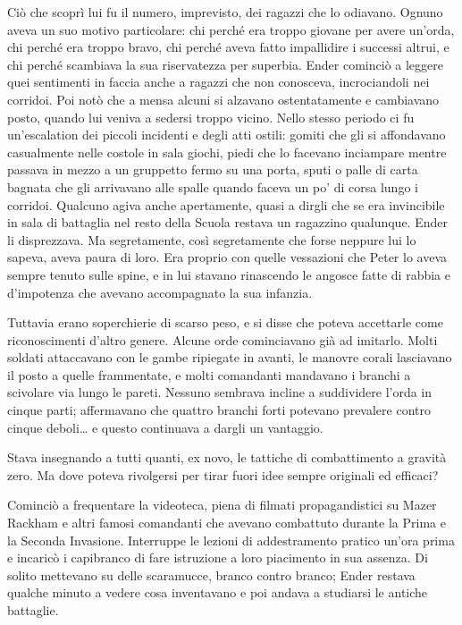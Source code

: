 {Ciò che scoprì lui fu il numero, imprevisto, dei ragazzi che lo
	odiavano. Ognuno aveva un suo motivo particolare: chi perché era troppo
	giovane per avere un'orda, chi perché era troppo bravo, chi perché aveva
	fatto impallidire i successi altrui, e chi perché scambiava la sua
	riservatezza per superbia. Ender cominciò a leggere quei sentimenti in
	faccia anche a ragazzi che non conosceva, incrociandoli nei corridoi.
	Poi notò che a mensa alcuni si alzavano ostentatamente e cambiavano
	posto, quando lui veniva a sedersi troppo vicino. Nello stesso periodo
	ci fu un'escalation dei piccoli incidenti e degli atti ostili: gomiti
	che gli si affondavano casualmente nelle costole in sala giochi, piedi
	che lo facevano inciampare mentre passava in mezzo a un gruppetto fermo
	su una porta, sputi o palle di carta bagnata che gli arrivavano alle
	spalle quando faceva un po' di corsa lungo i corridoi. Qualcuno agiva
	anche apertamente, quasi a dirgli che se era invincibile in sala di
	battaglia nel resto della Scuola restava un ragazzino qualunque. Ender
	li disprezzava. Ma segretamente, così segretamente che forse neppure lui
	lo sapeva, aveva paura di loro. Era proprio con quelle vessazioni che
	Peter lo aveva sempre tenuto sulle spine, e in lui stavano rinascendo le
	angosce fatte di rabbia e d'impotenza che avevano accompagnato la sua
	infanzia.}

{Tuttavia erano soperchierie di scarso peso, e si disse che poteva
	accettarle come riconoscimenti d'altro genere. Alcune orde cominciavano
	già ad imitarlo. Molti soldati attaccavano con le gambe ripiegate in
	avanti, le manovre corali lasciavano il posto a quelle frammentate, e
	molti comandanti mandavano i branchi a scivolare via lungo le pareti.
	Nessuno sembrava incline a suddividere l'orda in cinque parti;
	affermavano che quattro branchi forti potevano prevalere contro cinque
	deboli\ldots{} e questo continuava a dargli un vantaggio.}

{Stava insegnando a tutti quanti, ex novo, le tattiche di combattimento
	a gravità zero. Ma dove poteva rivolgersi per tirar fuori idee sempre
	originali ed efficaci?}

{Cominciò a frequentare la videoteca, piena di filmati propagandistici
	su Mazer Rackham e altri famosi comandanti che avevano combattuto
	durante la Prima e la Seconda Invasione. Interruppe le lezioni di
	addestramento pratico un'ora prima e incaricò i capibranco di fare
	istruzione a loro piacimento in sua assenza. Di solito mettevano su
	delle scaramucce, branco contro branco; Ender restava qualche minuto a
	vedere cosa inventavano e poi andava a studiarsi le antiche battaglie.}

